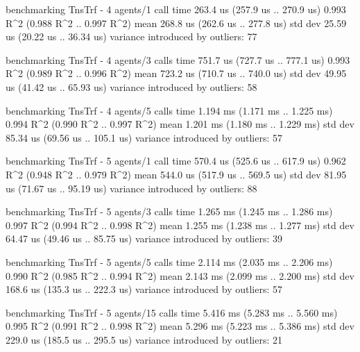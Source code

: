 \begin{showCode}
    benchmarking TnsTrf - 4 agents/1 call
    time                 263.4 us   (257.9 us .. 270.9 us)
                         0.993 R^2   (0.988 R^2 .. 0.997 R^2)
    mean                 268.8 us   (262.6 us .. 277.8 us)
    std dev              25.59 us   (20.22 us .. 36.34 us)
    variance introduced by outliers: 77%

    benchmarking TnsTrf - 4 agents/3 calls
    time                 751.7 us   (727.7 us .. 777.1 us)
                         0.993 R^2   (0.989 R^2 .. 0.996 R^2)
    mean                 723.2 us   (710.7 us .. 740.0 us)
    std dev              49.95 us   (41.42 us .. 65.93 us)
    variance introduced by outliers: 58%

    benchmarking TnsTrf - 4 agents/5 calls
    time                 1.194 ms   (1.171 ms .. 1.225 ms)
                         0.994 R^2   (0.990 R^2 .. 0.997 R^2)
    mean                 1.201 ms   (1.180 ms .. 1.229 ms)
    std dev              85.34 us   (69.56 us .. 105.1 us)
    variance introduced by outliers: 57%

    benchmarking TnsTrf - 5 agents/1 call
    time                 570.4 us   (525.6 us .. 617.9 us)
                         0.962 R^2   (0.948 R^2 .. 0.979 R^2)
    mean                 544.0 us   (517.9 us .. 569.5 us)
    std dev              81.95 us   (71.67 us .. 95.19 us)
    variance introduced by outliers: 88%

    benchmarking TnsTrf - 5 agents/3 calls
    time                 1.265 ms   (1.245 ms .. 1.286 ms)
                         0.997 R^2   (0.994 R^2 .. 0.998 R^2)
    mean                 1.255 ms   (1.238 ms .. 1.277 ms)
    std dev              64.47 us   (49.46 us .. 85.75 us)
    variance introduced by outliers: 39%

    benchmarking TnsTrf - 5 agents/5 calls
    time                 2.114 ms   (2.035 ms .. 2.206 ms)
                         0.990 R^2   (0.985 R^2 .. 0.994 R^2)
    mean                 2.143 ms   (2.099 ms .. 2.200 ms)
    std dev              168.6 us   (135.3 us .. 222.3 us)
    variance introduced by outliers: 57%

    benchmarking TnsTrf - 5 agents/15 calls
    time                 5.416 ms   (5.283 ms .. 5.560 ms)
                         0.995 R^2   (0.991 R^2 .. 0.998 R^2)
    mean                 5.296 ms   (5.223 ms .. 5.386 ms)
    std dev              229.0 us   (185.5 us .. 295.5 us)
    variance introduced by outliers: 21%


\end{showCode}
